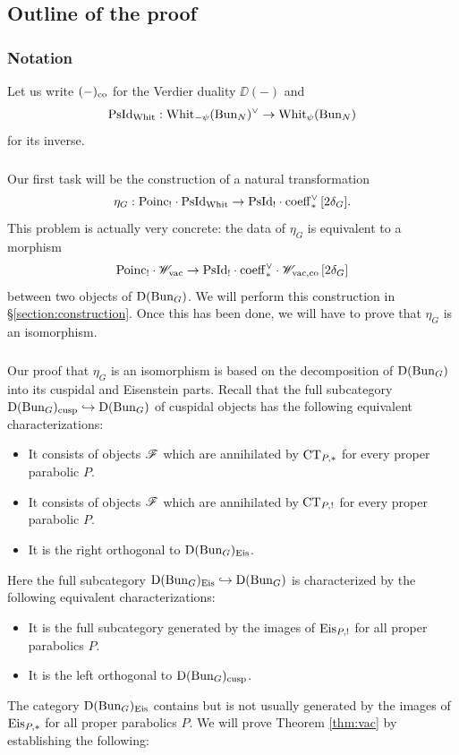 \subsection{Outline of the proof}

\subsubsection{Notation} Let us write $(-)_{\mathrm{co}}$ for the Verdier duality $\DD(-)$ and
    \[\mathrm{PsId}_{\mathrm{Whit}} : \mathrm{Whit}_{-\psi}(\mathrm{Bun}_N)^\vee \to \mathrm{Whit}_\psi(\mathrm{Bun}_N)\]
for its inverse.

\subsubsection{} Our first task will be the construction of a natural transformation
    \[\eta_G : \mathrm{Poinc}_! \cdot \mathrm{PsId}_{\mathrm{Whit}} \to \mathrm{PsId}_! \cdot \mathrm{coeff}_*^\vee \, [2\delta_G].\]
This problem is actually very concrete: the data of $\eta_G$ is equivalent to a morphism
    \[
    \mathrm{Poinc}_! \cdot \mathscr{W}_{\mathrm{vac}} \to \mathrm{PsId}_! \cdot \mathrm{coeff}_*^\vee \cdot \mathscr{W}_{\mathrm{vac}, \mathrm{co}} \, [2 \delta_G]
    \]
between two objects of $\mathrm{D}(\mathrm{Bun}_G)$. We will perform this construction in \S\ref{section:construction}. Once this has been done, we will have to prove that $\eta_G$ is an isomorphism.

\subsubsection{} Our proof that $\eta_G$ is an isomorphism is based on the decomposition of $\mathrm{D}(\mathrm{Bun}_G)$ into its cuspidal and Eisenstein parts. Recall that the full subcategory $\mathrm{D}(\mathrm{Bun}_G)_{\mathrm{cusp}} \hookrightarrow \mathrm{D}(\mathrm{Bun}_G)$ of cuspidal objects has the following equivalent characterizations:
\begin{itemize}
    \item It consists of objects $\mathscr{F}$ which are annihilated by $\mathrm{CT}_{P,*}$ for every proper parabolic $P$.
    \item It consists of objects $\mathscr{F}$ which are annihilated by $\mathrm{CT}_{P,!}$ for every proper parabolic $P$.
    \item It is the right orthogonal to $\mathrm{D}(\mathrm{Bun}_G)_{\mathrm{Eis}}$.
\end{itemize}
Here the full subcategory $\mathrm{D}(\mathrm{Bun}_G)_{\mathrm{Eis}} \hookrightarrow \mathrm{D}(\mathrm{Bun}_G)$ is characterized by the following equivalent characterizations:
\begin{itemize}
    \item It is the full subcategory generated by the images of $\mathrm{Eis}_{P,!}$ for all proper parabolics $P$.
    \item It is the left orthogonal to $\mathrm{D}(\mathrm{Bun}_G)_{\mathrm{cusp}}$.
\end{itemize}
The category $\mathrm{D}(\mathrm{Bun}_G)_{\mathrm{Eis}}$ contains but is not usually generated by the images of $\mathrm{Eis}_{P,*}$ for all proper parabolics $P$. We will prove Theorem \ref{thm:vac} by establishing the following:

